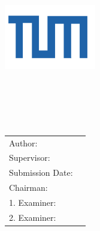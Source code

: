 \begin{titlepage}
\begin{center}
\centering
\vspace{40mm}
\includegraphics[width=40mm]{./includes/logo/tum} \\
\vspace{5mm}
{\huge\MakeUppercase{\getFaculty{}}}\\
\vspace{5mm}
{\large\MakeUppercase{\getUniversity{}}}\\
\vspace{30mm}
{\huge\bfseries \getTitle{}} \\
\end{center}
\vspace{15mm}
\getDoctypeger{} \\
\vspace{15mm}

\begin{center}
\begin{tabular}{l l}
Author: & \getAuthor{} \\
Supervisor: & \getSupervisor{} \\
Submission Date: & \getSubmissionDate{} \\ \hline
Chairman: & \getChairman{} \\
1. Examiner: & \getFirstExaminer{} \\
2. Examiner: & \getSecondExaminer{} \\
\end{tabular}
\end{center}
\end{titlepage}